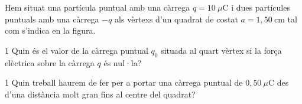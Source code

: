 Hem situat una partícula puntual amb una càrrega $q = 10\ \mu\mathrm{C}$ i dues partícules puntuals amb una càrrega $-q$ als vèrtexs d'un quadrat de costat $a = 1,50\ \mathrm{cm}$ tal com s'indica en la figura.


\begin{apartat}{1}
Quin és el valor de la càrrega puntual $q_0$ situada al quart vèrtex si la força elèctrica sobre la càrrega $q$ és nul·la?
\end{apartat}

\begin{apartat}{1}
Quin treball haurem de fer per a portar una càrrega puntual de $0,50\ \mu\mathrm{C}$ des d'una distància molt gran fins al centre del quadrat?
\end{apartat}

